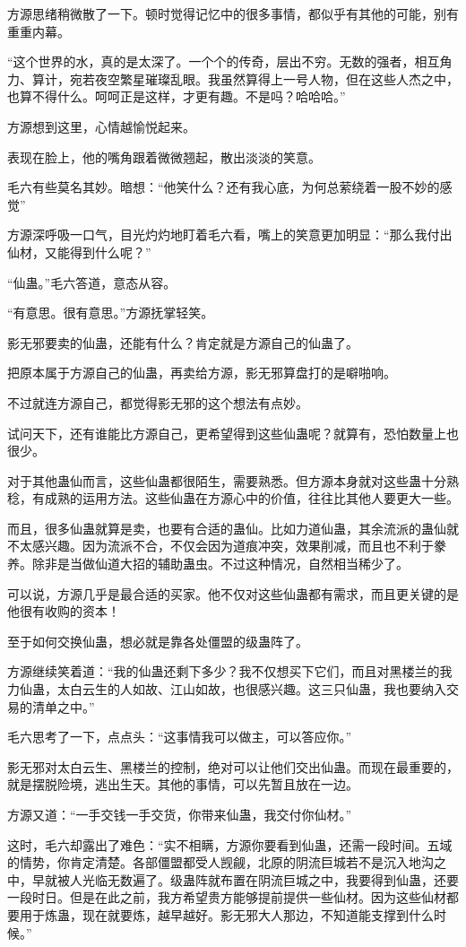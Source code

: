 \begin{this_body}
方源思绪稍微散了一下。顿时觉得记忆中的很多事情，都似乎有其他的可能，别有重重内幕。

“这个世界的水，真的是太深了。一个个的传奇，层出不穷。无数的强者，相互角力、算计，宛若夜空繁星璀璨乱眼。我虽然算得上一号人物，但在这些人杰之中，也算不得什么。呵呵正是这样，才更有趣。不是吗？哈哈哈。”

方源想到这里，心情越愉悦起来。

表现在脸上，他的嘴角跟着微微翘起，散出淡淡的笑意。

毛六有些莫名其妙。暗想：“他笑什么？还有我心底，为何总萦绕着一股不妙的感觉”

方源深呼吸一口气，目光灼灼地盯着毛六看，嘴上的笑意更加明显：“那么我付出仙材，又能得到什么呢？”

“仙蛊。”毛六答道，意态从容。

“有意思。很有意思。”方源抚掌轻笑。

影无邪要卖的仙蛊，还能有什么？肯定就是方源自己的仙蛊了。

把原本属于方源自己的仙蛊，再卖给方源，影无邪算盘打的是噼啪响。

不过就连方源自己，都觉得影无邪的这个想法有点妙。

试问天下，还有谁能比方源自己，更希望得到这些仙蛊呢？就算有，恐怕数量上也很少。

对于其他蛊仙而言，这些仙蛊都很陌生，需要熟悉。但方源本身就对这些蛊十分熟稔，有成熟的运用方法。这些仙蛊在方源心中的价值，往往比其他人要更大一些。

而且，很多仙蛊就算是卖，也要有合适的蛊仙。比如力道仙蛊，其余流派的蛊仙就不太感兴趣。因为流派不合，不仅会因为道痕冲突，效果削减，而且也不利于豢养。除非是当做仙道大招的辅助蛊虫。不过这种情况，自然相当稀少了。

可以说，方源几乎是最合适的买家。他不仅对这些仙蛊都有需求，而且更关键的是他很有收购的资本！

至于如何交换仙蛊，想必就是靠各处僵盟的级蛊阵了。

方源继续笑着道：“我的仙蛊还剩下多少？我不仅想买下它们，而且对黑楼兰的我力仙蛊，太白云生的人如故、江山如故，也很感兴趣。这三只仙蛊，我也要纳入交易的清单之中。”

毛六思考了一下，点点头：“这事情我可以做主，可以答应你。”

影无邪对太白云生、黑楼兰的控制，绝对可以让他们交出仙蛊。而现在最重要的，就是摆脱险境，逃出生天。其他的事情，可以先暂且放在一边。

方源又道：“一手交钱一手交货，你带来仙蛊，我交付你仙材。”

这时，毛六却露出了难色：“实不相瞒，方源你要看到仙蛊，还需一段时间。五域的情势，你肯定清楚。各部僵盟都受人觊觎，北原的阴流巨城若不是沉入地沟之中，早就被人光临无数遍了。级蛊阵就布置在阴流巨城之中，我要得到仙蛊，还要一段时日。但是在此之前，我方希望贵方能够提前提供一些仙材。因为这些仙材都要用于炼蛊，现在就要炼，越早越好。影无邪大人那边，不知道能支撑到什么时候。”


\end{this_body}
